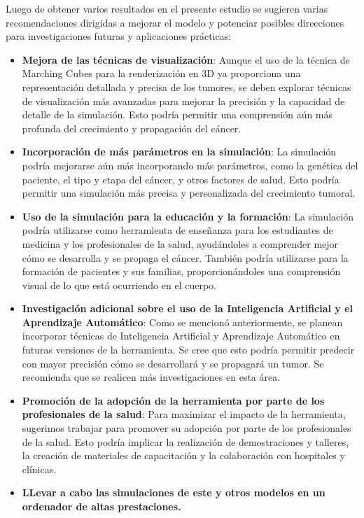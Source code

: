 \begin{recomendations}
    Luego de obtener varios resultados en el presente estudio se sugieren varias recomendaciones dirigidas a mejorar el modelo y potenciar posibles direcciones para investigaciones futuras y aplicaciones prácticas:
\begin{itemize}
    \item \textbf{Mejora de las técnicas de visualización}: Aunque el uso de la técnica de Marching Cubes para la renderización en 3D ya proporciona una representación detallada y precisa de los tumores, se deben explorar técnicas de visualización más avanzadas para mejorar la precisión y la capacidad de detalle de la simulación. Esto podría permitir una comprensión aún más profunda del crecimiento y propagación del cáncer.
    \item \textbf{Incorporación de más parámetros en la simulación}: La simulación podría mejorarse aún más incorporando más parámetros, como la genética del paciente, el tipo y etapa del cáncer, y otros factores de salud. Esto podría permitir una simulación más precisa y personalizada del crecimiento tumoral.
    \item \textbf{Uso de la simulación para la educación y la formación}: La simulación podría utilizarse como herramienta de enseñanza para los estudiantes de medicina y los profesionales de la salud, ayudándoles a comprender mejor cómo se desarrolla y se propaga el cáncer. También podría utilizarse para la formación de pacientes y sus familias, proporcionándoles una comprensión visual de lo que está ocurriendo en el cuerpo.
    \item \textbf{Investigación adicional sobre el uso de la Inteligencia Artificial y el Aprendizaje Automático}: Como se mencion\'o anteriormente, se planean incorporar técnicas de Inteligencia Artificial y Aprendizaje Automático en futuras versiones de la herramienta. Se cree que esto podría permitir predecir con mayor precisión cómo se desarrollará y se propagará un tumor. Se recomienda que se realicen más investigaciones en esta área.
    \item \textbf{Promoción de la adopción de la herramienta por parte de los profesionales de la salud}: Para maximizar el impacto de la herramienta, sugerimos trabajar para promover su adopción por parte de los profesionales de la salud. Esto podría implicar la realización de demostraciones y talleres, la creación de materiales de capacitación y la colaboración con hospitales y clínicas.
    \item \textbf{LLevar a cabo las simulaciones de este y otros modelos en un ordenador de altas prestaciones.}

\end{itemize}
\end{recomendations}
